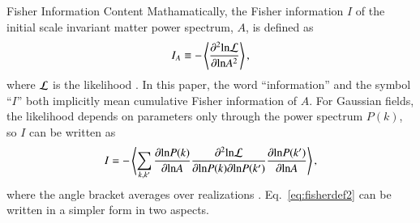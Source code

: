 \begin{section}{Fisher Information Content}
  \label{sec:fisherinfo}
  Mathamatically, the Fisher information $I$ of the initial scale
  invariant matter power spectrum, $A$, is defined as
  \begin{align}
    I_A \equiv -\left\langle \frac{\partial ^2 \mathrm{ln \mathcal{L}}}{\partial  \mathrm{ln} A ^2}\right\rangle,
    \label{eq:fisherdefine}
  \end{align}
  where $\mathcal{L}$ is the likelihood \citep{bib:Tegmark1997}.  
  In this paper, the word \enquote{information} and the symbol \enquote{$I$} both implicitly 
  mean cumulative Fisher information 
  of $A$. For Gaussian
  fields, the likelihood depends on parameters only through the
  power spectrum $P(k)$, so $I$ can be written as 
  \begin{align}
    I = - \left\langle \sum_{k,k'} \frac{\partial \mathrm{ln} P(k)}{\partial \mathrm{ln} A} 
    \frac{\partial ^2 \mathrm{ln \mathcal{L}}}{\partial \mathrm{ln} P(k) \partial \mathrm{ln} P(k')}
    \frac{\partial \mathrm{ln} P(k')}{\partial \mathrm{ln} A}\right\rangle,
    \label{eq:fisherdef2}
  \end{align}
  where the angle bracket averages over realizations
  \citep{bib:Rimes2006}.
  Eq.~\ref{eq:fisherdef2} can be written in a simpler
  form in two aspects.   
  

\end{section}
